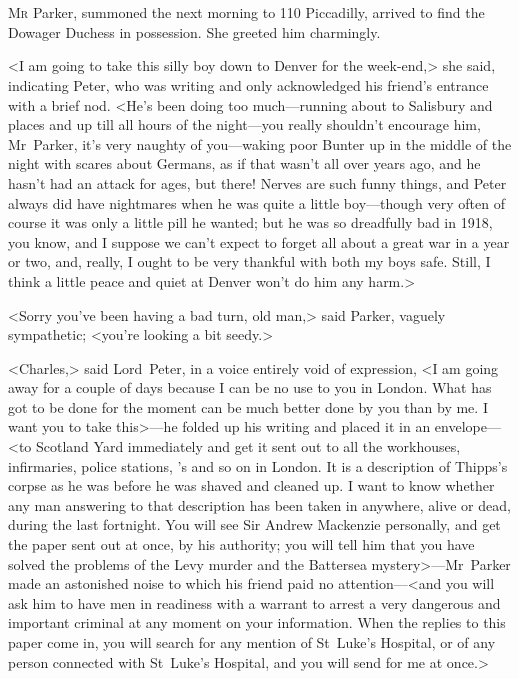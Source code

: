 \chapter[Chapter \thechapter]{}
\lettrine{M}{r} Parker, summoned the next morning to 110 Piccadilly, arrived to find the Dowager Duchess in possession. She greeted him charmingly.

\zz
<I am going to take this silly boy down to Denver for the week-end,> she said, indicating Peter, who was writing and only acknowledged his friend's entrance with a brief nod. <He's been doing too much—running about to Salisbury and places and up till all hours of the night—you really shouldn't encourage him, Mr~Parker, it's very naughty of you—waking poor Bunter up in the middle of the night with scares about Germans, as if that wasn't all over years ago, and he hasn't had an attack for ages, but there! Nerves are such funny things, and Peter always did have nightmares when he was quite a little boy—though very often of course it was only a little pill he wanted; but he was so dreadfully bad in 1918, you know, and I suppose we can't expect to forget all about a great war in a year or two, and, really, I ought to be very thankful with both my boys safe. Still, I think a little peace and quiet at Denver won't do him any harm.>

<Sorry you've been having a bad turn, old man,> said Parker, vaguely sympathetic; <you're looking a bit seedy.>

<Charles,> said Lord~Peter, in a voice entirely void of expression, <I am going away for a couple of days because I can be no use to you in London. What has got to be done for the moment can be much better done by you than by me. I want you to take this>—he folded up his writing and placed it in an envelope—<to Scotland Yard immediately and get it sent out to all the workhouses, infirmaries, police stations, 's and so on in London. It is a description of Thipps's corpse as he was before he was shaved and cleaned up. I want to know whether any man answering to that description has been taken in anywhere, alive or dead, during the last fortnight. You will see Sir Andrew Mackenzie personally, and get the paper sent out at once, by his authority; you will tell him that you have solved the problems of the Levy murder and the Battersea mystery>—Mr~Parker made an astonished noise to which his friend paid no attention—<and you will ask him to have men in readiness with a warrant to arrest a very dangerous and important criminal at any moment on your information. When the replies to this paper come in, you will search for any mention of St~Luke's Hospital, or of any person connected with St~Luke's Hospital, and you will send for me at once.>

